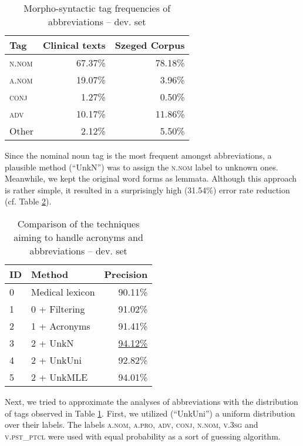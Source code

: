 \begin{table}[H]
\centering
\caption{Morpho-syntactic tag frequencies of abbreviations -- dev. set}
\label{tab:pos_distribution}
\begin{tabular}{ l r r} 
\hline
Tag & Clinical texts & Szeged Corpus  \\ 
\hline
\scshape{n.nom} & 67.37\% & 78.18\% \\
\scshape{a.nom} & 19.07\% & 3.96\% \\
\scshape{conj} & 1.27\% & 0.50\% \\
\scshape{adv} & 10.17\% & 11.86\% \\
Other & 2.12\% & 5.50\% \\
\hline
\end{tabular}
\end{table}

Since the nominal noun tag is the most frequent amongst abbreviations, a plausible method (``UnkN'') was to assign the \textsc{n.nom} label to unknown ones. 
Meanwhile, we kept the original word forms as lemmata. 
Although this approach is rather simple, it resulted in a surprisingly high (31.54\%) error rate reduction (cf. Table \ref{tab:abbrev_fixes}). 

\begin{table}[H]
\centering
\caption{Comparison of the techniques aiming to handle acronyms and abbreviations --  dev. set}
\label{tab:abbrev_fixes}
\begin{tabular}{ l l r } 
\hline
ID & Method &  Precision \\
\hline
0 & Medical lexicon & 90.11\% \\
1 & 0 + Filtering & 91.02\% \\
2 & 1 + Acronyms & 91.41\% \\
3 & 2 + UnkN & \underline{94.12\%} \\
4 & 2 + UnkUni & 92.82\% \\
5 & 2 + UnkMLE & 94.01\% \\
\hline
\end{tabular}
\end{table}

Next, we tried to approximate the analyses of abbreviations with the distribution of tags observed in Table \ref{tab:pos_distribution}. 
First, we utilized (``UnkUni'') a uniform distribution over their labels. %
The labels \textsc{a.nom}, \textsc{a.pro}, \textsc{adv}, \textsc{conj}, \textsc{n.nom}, \textsc{v.3sg} and \textsc{v.pst\_ptcl} were used with equal probability as a sort of guessing algorithm.

